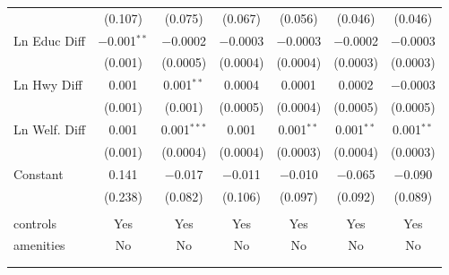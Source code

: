 \begin{table}[!htbp]
\begin{tabular}{@{\extracolsep{5pt}}lcccccc}
  & (0.107) & (0.075) & (0.067) & (0.056) & (0.046) & (0.046) \\ 
  Ln Educ Diff & $-$0.001$^{**}$ & $-$0.0002 & $-$0.0003 & $-$0.0003 & $-$0.0002 & $-$0.0003 \\ 
  & (0.001) & (0.0005) & (0.0004) & (0.0004) & (0.0003) & (0.0003) \\ 
  Ln Hwy Diff & 0.001 & 0.001$^{**}$ & 0.0004 & 0.0001 & 0.0002 & $-$0.0003 \\ 
  & (0.001) & (0.001) & (0.0005) & (0.0004) & (0.0005) & (0.0005) \\ 
  Ln Welf. Diff & 0.001 & 0.001$^{***}$ & 0.001 & 0.001$^{**}$ & 0.001$^{**}$ & 0.001$^{**}$ \\ 
  & (0.001) & (0.0004) & (0.0004) & (0.0003) & (0.0004) & (0.0003) \\ 
  Constant & 0.141 & $-$0.017 & $-$0.011 & $-$0.010 & $-$0.065 & $-$0.090 \\ 
  & (0.238) & (0.082) & (0.106) & (0.097) & (0.092) & (0.089) \\ 
 \hline \\[-1.8ex] 
controls & Yes & Yes & Yes & Yes & Yes & Yes \\ 
amenities & No & No & No & No & No & No \\ 
\hline \\[-1.8ex] 
\hline 
\hline \\[-1.8ex] 
\end{tabular} 
\end{table} 
